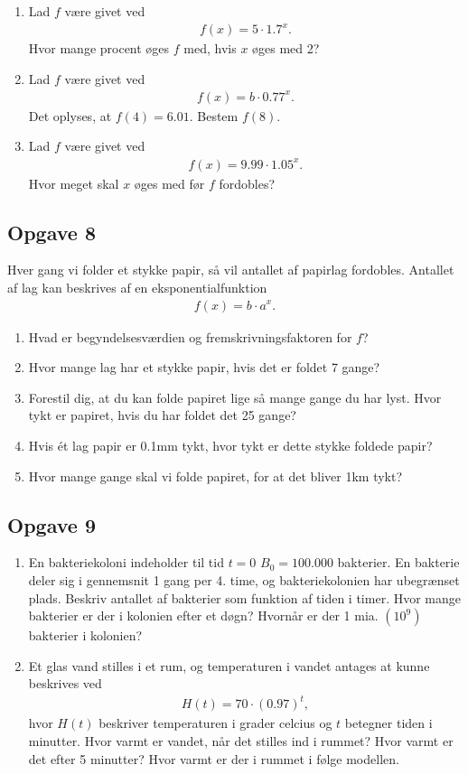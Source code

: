 \begin{enumerate}[label=\roman*)]
	\item Lad $f$ være givet ved
	\begin{align*}
		f(x) = 5\cdot 1.7^x.
	\end{align*}
	Hvor mange procent øges $f$ med, hvis $x$ øges med 2?
	\item Lad $f$ være givet ved
	\begin{align*}
		f(x) = b\cdot 0.77^x.
	\end{align*}
	Det oplyses, at $f(4) = 6.01$. Bestem $f(8)$. 
	\item Lad $f$ være givet ved
	\begin{align*}
		f(x) = 9.99 \cdot 1.05^x.
	\end{align*}
	Hvor meget skal $x$ øges med før $f$ fordobles?
\end{enumerate}


\subsection*{Opgave 8}
Hver gang vi folder et stykke papir, så vil antallet af papirlag fordobles. Antallet af lag kan beskrives af en eksponentialfunktion 
\begin{align*}
	f(x) = b\cdot a^x.
\end{align*}
\begin{enumerate}[label=\roman*)]
	\item Hvad er begyndelsesværdien og fremskrivningsfaktoren for $f$?
	\item Hvor mange lag har et stykke papir, hvis det er foldet 7 gange?
	\item Forestil dig, at du kan folde papiret lige så mange gange du har lyst. Hvor tykt er
	papiret, hvis du har foldet det 25 gange?
 	\item Hvis ét lag papir er 0.1mm tykt, hvor tykt er dette stykke foldede papir?
	\item Hvor mange gange skal vi folde papiret, for at det bliver 1km tykt?
\end{enumerate}
\subsection*{Opgave 9}
\begin{enumerate}[label=\roman*)]
\item En bakteriekoloni indeholder til tid $t=0$ $B_0 = 100.000$ bakterier. En bakterie deler sig i gennemsnit 1 gang per 4. time, og bakteriekolonien har ubegrænset plads. Beskriv antallet af bakterier som funktion af tiden i timer. Hvor mange bakterier er der i kolonien efter et døgn? Hvornår er der 1 mia. $(10^9)$ bakterier i kolonien?
\item Et glas vand stilles i et rum, og temperaturen i vandet antages at kunne beskrives ved
\begin{align*}
H(t) = 70\cdot(0.97)^t,
\end{align*}
hvor $H(t)$ beskriver temperaturen i grader celcius og $t$ betegner tiden i minutter. Hvor varmt er vandet, når det stilles ind i rummet? Hvor varmt er det efter 5 minutter? Hvor varmt er der i rummet i følge modellen. 
\end{enumerate}

